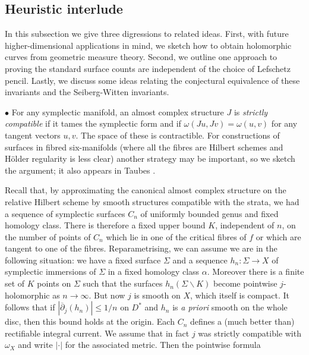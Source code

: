 \documentclass[10pt]{article}
\newcommand{\cdbar}{\overline{\partial}}
\begin{document}

\subsection{Heuristic interlude}

In this subsection we give three digressions to related ideas.  First,
with future higher-dimensional applications in mind, we sketch how to
obtain holomorphic curves from geometric measure theory.  Second, we
outline one approach to proving the standard surface counts are
independent of the choice of Lefschetz pencil.  Lastly, we discuss
some ideas relating the conjectural equivalence of these invariants
and the Seiberg-Witten invariants.

\vspace{0.3cm}

\noindent $\bullet$ For any symplectic manifold,
an almost complex structure $J$ is \emph{strictly compatible} if it
tames the symplectic form and if $\omega(Ju,Jv) = \omega(u,v)$ for any
tangent vectors $u,v$.  The space of these is contractible.
For constructions of
surfaces in fibred six-manifolds (where all the fibres are Hilbert
schemes and H\"older regularity is less clear) another strategy may be
important, so we sketch the argument;  it also appears in Taubes
\cite{Taubes:SWtoGr}.  

\vspace{0.2cm}

\noindent Recall that, by approximating the canonical almost complex
structure on the relative Hilbert scheme by smooth structures
compatible with the strata, we had a
sequence of symplectic surfaces $C_n$ of uniformly bounded genus and
fixed homology class. There is therefore a
fixed upper bound $K$, independent of $n$, on the number of points of
$C_n$ which lie in
one of the critical fibres of $f$ or which are tangent to one of the
fibres.  Reparametrising, we can assume we are in the following
situation:  we have a fixed surface $\Sigma$ and a sequence $h_n:
\Sigma \rightarrow X$ of symplectic immersions of $\Sigma$ in a fixed
homology class $\alpha$.  Moreover there is a finite set of $K$ points
on $\Sigma$ such that the surfaces $h_n (\Sigma \backslash K)$ become pointwise
$j$-holomorphic as $n \rightarrow \infty$.  But now $j$ is smooth on
$X$, which itself is compact.  It
follows that if $|\cdbar_j(h_n)| \leq 1/n$ on $D^*$ and $h_n$ is \emph{a
  priori} smooth on the whole disc, then this bound holds
at the origin.  Each
$C_n$ defines a (much better than) rectifiable integral current.  We
assume that in fact $j$ was strictly compatible with $\omega_X$ and
write $| \cdot |$ for the associated metric.  Then
the pointwise formula
\end{document}
